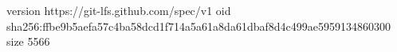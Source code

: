 version https://git-lfs.github.com/spec/v1
oid sha256:ffbe9b5aefa57c4ba58dcd1f714a5a61a8da61dbaf8d4c499ae5959134860300
size 5566
